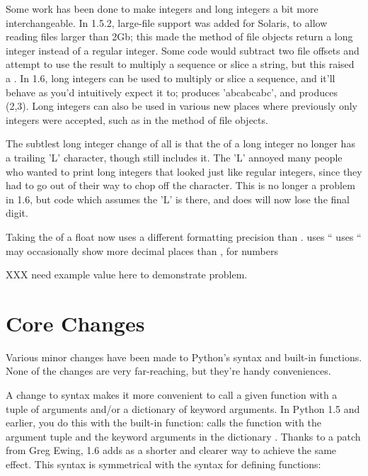 \documentclass{howto}
\begin{document}
Some work has been done to make integers and long integers a bit more
interchangeable.  In 1.5.2, large-file support was added for Solaris,
to allow reading files larger than 2Gb; this made the 
method of file objects return a long integer instead of a regular
integer.  Some code would subtract two file offsets and attempt to use
the result to multiply a sequence or slice a string, but this raised a
.   In 1.6, long integers can be used to multiply
or slice a sequence, and it'll behave as you'd intuitively expect it to; 
 produces 'abcabcabc', and 
 produces (2,3). Long integers can also be
used in various new places where previously only integers were
accepted, such as in the  method of file objects.

The subtlest long integer change of all is that the 
of a long integer no longer has a trailing 'L' character, though
 still includes it.  The 'L' annoyed many people who
wanted to print long integers that looked just like regular integers,
since they had to go out of their way to chop off the character.  This
is no longer a problem in 1.6, but code which assumes the 'L' is
there, and does  will now lose the final
digit.  

Taking the  of a float now uses a different
formatting precision than .   uses
``%
 uses ``%
 may occasionally show more decimal places than 
, for numbers 

XXX need example value here to demonstrate problem.


\section{Core Changes}

Various minor changes have been made to Python's syntax and built-in
functions.  None of the changes are very far-reaching, but they're
handy conveniences.

A change to syntax makes it more convenient to call a given function
with a tuple of arguments and/or a dictionary of keyword arguments.
In Python 1.5 and earlier, you do this with the 
built-in function:  calls the
function  with the argument tuple  and the
keyword arguments in the dictionary .  Thanks to a patch from
Greg Ewing, 1.6 adds  as a shorter
and clearer way to achieve the same effect.  This syntax is
symmetrical with the syntax for defining functions:
\end{document}
